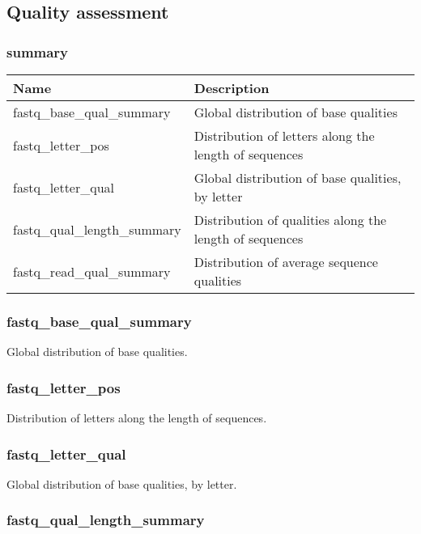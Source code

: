 \documentclass[a4paper,12pt]{article}
\begin{document}
\subsection{Quality assessment}

\subsubsection{summary}


\begin{tabularx}{\textwidth}{|X|X|}
    \hline
    \textbf{Name}                   & \textbf{Description} \\
    \hline
    \hline
    fastq\_base\_qual\_summary      & Global distribution of base qualities \\
    fastq\_letter\_pos              & Distribution of letters along the length of sequences \\
    fastq\_letter\_qual             & Global distribution of base qualities, by letter \\
    fastq\_qual\_length\_summary    & Distribution of qualities along the length of sequences \\
    fastq\_read\_qual\_summary      & Distribution of average sequence qualities \\
    \hline
\end{tabularx}

\subsubsection{fastq\_base\_qual\_summary}

Global distribution of base qualities.

\subsubsection{fastq\_letter\_pos}

Distribution of letters along the length of sequences.

\subsubsection{fastq\_letter\_qual}

Global distribution of base qualities, by letter.

\subsubsection{fastq\_qual\_length\_summary}
\end{document}

